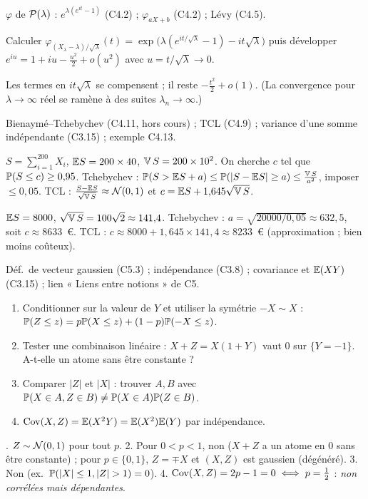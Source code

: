 \documentclass[11pt,a4paper]{article}
\begin{document}
\begin{exo}
\outils $\varphi$ de $\mathcal{P}(\lambda)$ : $e^{\lambda(e^{it}-1)}$ (C4.2) ; $\varphi_{aX+b}$ (C4.2) ; Lévy (C4.5).

\meth Calculer $\varphi_{(X_\lambda-\lambda)/\sqrt\lambda}(t)=\exp\bigl(\lambda(e^{it/\sqrt\lambda}-1)-it\sqrt\lambda\bigr)$ puis développer
$e^{iu}=1+iu-\frac{u^2}2+o(u^2)$ avec $u=t/\sqrt\lambda\to0$.

\indic Les termes en $it\sqrt\lambda$ se compensent ; il reste $-\frac{t^2}2+o(1)$. (La convergence pour $\lambda\to\infty$ réel se ramène
à des suites $\lambda_n\to\infty$.)
\end{exo}

\begin{exo}
\outils Bienaymé--Tchebychev (C4.11, hors cours) ; TCL (C4.9) ; variance d'une somme indépendante (C3.15) ; exemple C4.13.

\meth $S=\sum_{i=1}^{200}X_i$, $\mathbb{E} S=200\times40$, $\operatorname{\mathbb{V}} S=200\times10^2$. On cherche $c$ tel que $\mathbb{P}(S\le c)\ge0{,}95$.
Tchebychev : $\mathbb{P}(S>\mathbb{E} S+a)\le\mathbb{P}(|S-\mathbb{E} S|\ge a)\le\frac{\operatorname{\mathbb{V}} S}{a^2}$, imposer $\le0{,}05$.
TCL : $\frac{S-\mathbb{E} S}{\sqrt{\operatorname{\mathbb{V}} S}}\approx\mathcal{N}(0,1)$ et $c=\mathbb{E} S+1{,}645\sqrt{\operatorname{\mathbb{V}} S}$.

\rep $\mathbb{E} S=8000$, $\sqrt{\operatorname{\mathbb{V}} S}=100\sqrt2\approx141{,}4$.
Tchebychev : $a=\sqrt{20000/0{,}05}\approx632{,}5$, soit $c\approx8633$~€.
TCL : $c\approx8000+1{,}645\times141{,}4\approx8233$~€ (approximation ; bien moins coûteux).
\end{exo}

\begin{exo}[$Z=XY$ : gaussienne sans vecteur gaussien]
\outils Déf.\ de vecteur gaussien (C5.3) ; indépendance (C3.8) ; covariance et $\mathbb{E}(XY)$ (C3.15) ; lien « Liens entre notions » de C5.

\meth
\begin{enumerate}
  \item Conditionner sur la valeur de $Y$ et utiliser la symétrie $-X\sim X$ : $\mathbb{P}(Z\le z)=p\mathbb{P}(X\le z)+(1-p)\mathbb{P}(-X\le z)$.
  \item Tester une combinaison linéaire : $X+Z=X(1+Y)$ vaut $0$ sur $\{Y=-1\}$. A-t-elle un atome sans être constante ?
  \item Comparer $|Z|$ et $|X|$ : trouver $A,B$ avec $\mathbb{P}(X\in A,Z\in B)\neq\mathbb{P}(X\in A)\mathbb{P}(Z\in B)$.
  \item $\operatorname{Cov}(X,Z)=\mathbb{E}(X^2Y)=\mathbb{E}(X^2)\mathbb{E}(Y)$ par indépendance.
\end{enumerate}

. $Z\sim\mathcal{N}(0,1)$ pour tout $p$. 2. Pour $0<p<1$, non ($X+Z$ a un atome en 0 sans être constante) ; pour $p\in\{0,1\}$,
$Z=\mp X$ et $(X,Z)$ est gaussien (dégénéré). 3. Non (ex.\ $\PP(|X|\le1,|Z|>1)=0$). 4. $\operatorname{Cov}(X,Z)=2p-1=0\iff p=\frac12$ :
\emph{non corrélées mais dépendantes}.
\end{exo}
\end{document}
